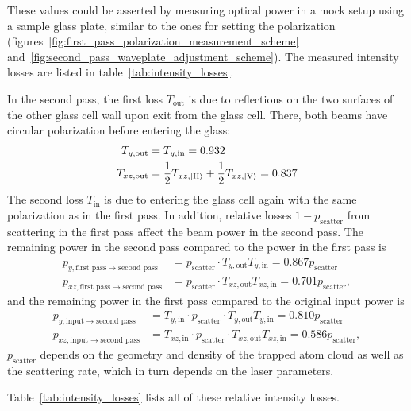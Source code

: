 These values could be asserted by measuring optical power in a mock setup using a sample glass plate, similar to the ones for setting the polarization (figures~\ref{fig:first_pass_polarization_measurement_scheme} and~\ref{fig:second_pass_waveplate_adjustment_scheme}). The measured intensity losses are listed in table~\ref{tab:intensity_losses}.

In the second pass, the first loss $T_{\text{out}}$ is due to reflections on the two surfaces of the other glass cell wall upon exit from the glass cell. There, both beams have circular polarization before entering the glass:
\begin{align}
    T_{y, \text{out}} &= T_{y, \text{in}} = 0.932 \\
    T_{xz, \text{out}} &= \frac{1}{2} T_{xz, \Ket{\text{H}}} + \frac{1}{2} T_{xz, \Ket{\text{V}}} = 0.837
\end{align}
The second loss $T_{\text{in}}$ is due to entering the glass cell again with the same polarization as in the first pass. In addition, relative losses $1 - p_\text{scatter}$ from scattering in the first pass affect the beam power in the second pass. The remaining power in the second pass compared to the power in the first pass is
\begin{align}
    p_{y, \text{first pass} \rightarrow \text{second pass}} &= p_\text{scatter} \cdot T_{y, \text{out}} T_{y, \text{in}}   =  0.867 p_\text{scatter}\\
    p_{xz, \text{first pass} \rightarrow \text{second pass}} &= p_\text{scatter} \cdot T_{xz, \text{out}} T_{xz, \text{in}}   = 0.701 p_\text{scatter},
\end{align}
and the remaining power in the first pass compared to the original input power is
\begin{align}
    p_{y, \text{input} \rightarrow \text{second pass}} &= T_{y, \text{in}} \cdot p_\text{scatter} \cdot T_{y, \text{out}} T_{y, \text{in}} =  0.810 p_\text{scatter} \\
    p_{xz, \text{input} \rightarrow \text{second pass}} &= T_{xz, \text{in}} \cdot p_\text{scatter} \cdot T_{xz, \text{out}} T_{xz, \text{in}} = 0.586 p_\text{scatter},
\end{align}
$p_\text{scatter}$ depends on the geometry and density of the trapped atom cloud as well as the scattering rate, which in turn depends on the laser parameters.

Table~\ref{tab:intensity_losses} lists all of these relative intensity losses.

